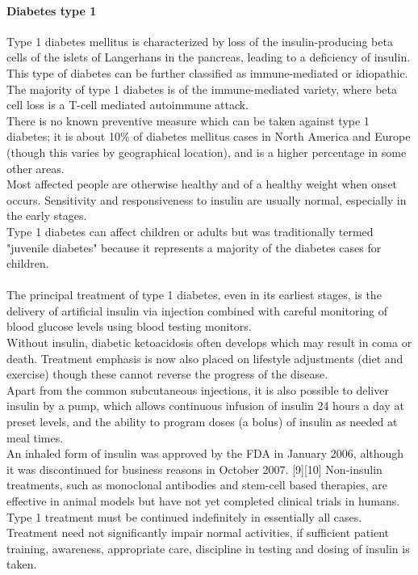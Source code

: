 \documentclass[pdflatex,a4paper,11pt,english]{scrreprt}
\begin{document}
\paragraph{Diabetes type 1} 
Type 1 diabetes mellitus is characterized by loss of the insulin-producing beta cells of the islets of Langerhans in the pancreas, leading to a deficiency of insulin. \\
This type of diabetes can be further classified as immune-mediated or idiopathic. The majority of type 1 diabetes is of the immune-mediated variety, where beta cell loss is a T-cell mediated autoimmune attack. \\
There is no known preventive measure which can be taken against type 1 diabetes; it is about 10\% of diabetes mellitus cases in North America and Europe (though this varies by geographical location), and is a higher percentage in some other areas. \\
Most affected people are otherwise healthy and of a healthy weight when onset occurs. Sensitivity and responsiveness to insulin are usually normal, especially in the early stages. \\
Type 1 diabetes can affect children or adults but was traditionally termed "juvenile diabetes" because it represents a majority of the diabetes cases for children. \\ \\
The principal treatment of type 1 diabetes, even in its earliest stages, is the delivery of artificial insulin via injection combined with careful monitoring of blood glucose levels using blood testing monitors. \\
Without insulin, diabetic ketoacidosis often develops which may result in coma or death. Treatment emphasis is now also placed on lifestyle adjustments (diet and exercise) though these cannot reverse the progress of the disease. \\
Apart from the common subcutaneous injections, it is also possible to deliver insulin by a pump, which allows continuous infusion of insulin 24 hours a day at preset levels, and the ability to program doses (a bolus) of insulin as needed at meal times. \\
An inhaled form of insulin was approved by the FDA in January 2006, although it was discontinued for business reasons in October 2007. [9][10] Non-insulin treatments, such as monoclonal antibodies and stem-cell based therapies, 
are effective in animal models but have not yet completed clinical trials in humans. \\ 
Type 1 treatment must be continued indefinitely in essentially all cases. Treatment need not significantly impair normal activities, if sufficient patient training, awareness, appropriate care, discipline in testing and dosing of insulin is taken. \\
\end{document}
